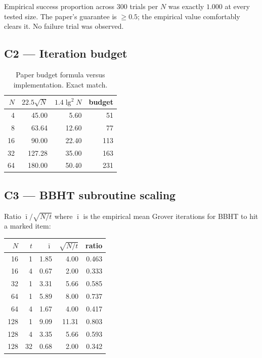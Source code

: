\documentclass[11pt]{article}
\begin{document}
Empirical success proportion across 300 trials per $N$ was exactly $1.000$ at
every tested size. The paper's guarantee is $\geq 0.5$; the empirical value
comfortably clears it. No failure trial was observed.

\subsection{C2 --- Iteration budget}
\begin{table}[h]
\centering
\begin{tabular}{@{}rrrr@{}}
\toprule
$N$ & $22.5\sqrt{N}$ & $1.4\lg^2 N$ & budget \\
\midrule
4   &  45.00 &  5.60 &  51 \\
8   &  63.64 & 12.60 &  77 \\
16  &  90.00 & 22.40 & 113 \\
32  & 127.28 & 35.00 & 163 \\
64  & 180.00 & 50.40 & 231 \\
\bottomrule
\end{tabular}
\caption{Paper budget formula versus implementation. Exact match.}
\label{tab:budget}
\end{table}

\subsection{C3 --- BBHT subroutine scaling}

Ratio $\bar\imath / \sqrt{N/t}$ where $\bar\imath$ is the empirical mean Grover
iterations for BBHT to hit a marked item:

\begin{center}
\begin{tabular}{@{}rrrrr@{}}
\toprule
$N$ & $t$ & $\bar\imath$ & $\sqrt{N/t}$ & ratio \\
\midrule
16  & 1  & 1.85 &  4.00 & 0.463 \\
16  & 4  & 0.67 &  2.00 & 0.333 \\
32  & 1  & 3.31 &  5.66 & 0.585 \\
64  & 1  & 5.89 &  8.00 & 0.737 \\
64  & 4  & 1.67 &  4.00 & 0.417 \\
128 & 1  & 9.09 & 11.31 & 0.803 \\
128 & 4  & 3.35 &  5.66 & 0.593 \\
128 & 32 & 0.68 &  2.00 & 0.342 \\
\bottomrule
\end{tabular}
\end{center}
\end{document}

